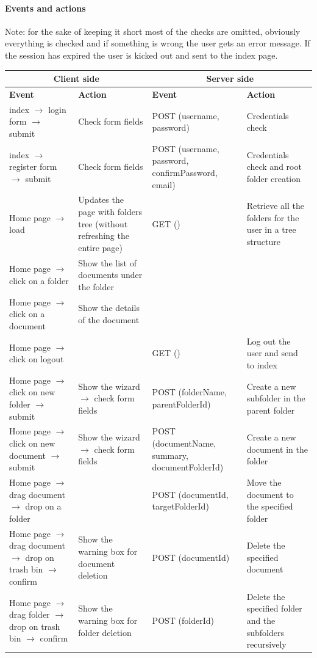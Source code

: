 \documentclass[a4paper,12pt]{article}
\begin{document}
\paragraph{Events and actions}
Note: for the sake of keeping it short most of the checks are omitted, obviously everything is checked and if something is wrong the user gets an error message. If the session has expired the user is kicked out and sent to the index page.
\begin{center}
\begin{tabular}{|p{4cm}|p{4cm}|p{4cm}|p{4cm}|}
\hline

\multicolumn{2}{|c|}{\textbf{Client side}} & \multicolumn{2}{c|}{\textbf{Server side}}\\
\hline
\textbf{Event} & \textbf{Action} & \textbf{Event} & \textbf{Action} \\
\hline 
index $\rightarrow$ login form $\rightarrow$ submit & Check form fields & POST (username, password) & Credentials check \\
\hline 
index $\rightarrow$ register form $\rightarrow$ submit & Check form fields & POST (username, password, confirmPassword, email) & Credentials check and root folder creation\\
\hline  
Home page $\rightarrow$ load & Updates the page with folders tree (without refreshing the entire page) & GET () & Retrieve all the folders for the user in a tree structure\\
\hline
Home page $\rightarrow$ click on a folder & Show the list of documents under the folder & &\\
\hline
Home page $\rightarrow$ click on a document & Show the details of the document & &\\
\hline
Home page $\rightarrow$ click on logout & & GET () & Log out the user and send to index\\
\hline
Home page $\rightarrow$ click on new folder $\rightarrow$ submit & Show the wizard $\rightarrow$ check form fields & POST (folderName, parentFolderId) & Create a new subfolder in the parent folder\\
\hline
Home page $\rightarrow$ click on new document $\rightarrow$  submit & Show the wizard $\rightarrow$ check form fields & POST (documentName, summary, documentFolderId) & Create a new document in the folder\\
\hline
Home page $\rightarrow$  drag document $\rightarrow$  drop on a folder & & POST (documentId, targetFolderId) & Move the document to the specified folder\\
\hline
Home page $\rightarrow$ drag document $\rightarrow$ drop on trash bin $\rightarrow$ confirm & Show the warning box for document deletion & POST (documentId) & Delete the specified document\\
\hline
Home page $\rightarrow$ drag folder $\rightarrow$ drop on trash bin $\rightarrow$ confirm & Show the warning box for folder deletion & POST (folderId) & Delete the specified folder and the subfolders recursively\\
\hline
\end{tabular}
\end{center}
\newpage
\end{document}
